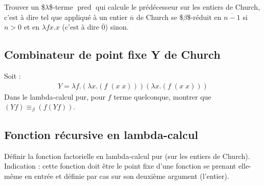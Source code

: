 \documentclass[11pt, a4paper]{article}
\begin{document}
Trouver un \$\(\lambda\)\$-terme \(\operatorname{pred}\) qui calcule le
prédécesseur sur les entiers de Church, c'est à dire tel que appliqué
à un entier \(\overline{n}\) de Church se \$\(\beta\)\$-réduit en \(\overline{n -
1}\) si \(n > 0\) et en \(\lambda fx. x\) (c'est à dire \(\overline{0}\)) sinon.

\subsection{Combinateur de point fixe Y de Church}
\label{sec:org19639bd}
Soit :
\begin{gather*}
   Y = \lambda f.(\lambda x.(f\; (x\; x))) (\lambda x.(f\; (x\; x)))
  \end{gather*}
Dans le lambda-calcul pur, pour \(f\) terme quelconque, montrer que \((Y f) \equiv_{\beta} (f (Y f))\).

\subsection{Fonction récursive en lambda-calcul}
\label{sec:org7a3087d}
Définir la fonction factorielle en lambda-calcul pur (sur les entiers
de Church). Indication : cette fonction doit être le point fixe d'une
fonction se prenant elle-même en entrée et définie par cas sur son
deuxième argument (l'entier).
\end{document}
